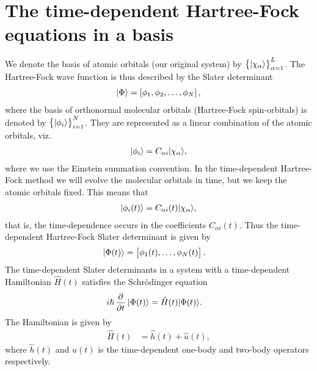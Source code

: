 \section{The time-dependent Hartree-Fock equations in a basis}
    We denote the basis of atomic orbitals (our original system) by
    $\left\{ | \chi_\alpha \rangle \right\}_{\alpha = 1}^L$. The Hartree-Fock wave function is
    thus described by the Slater determinant
    \begin{align}
        | \Phi \rangle = \left[ \phi_1, \phi_2, \dots, \phi_N \right],
    \end{align}
    where the basis of orthonormal molecular orbitals (Hartree-Fock
    spin-orbitals) is denoted by $\left\{ | \phi_i \rangle \right\}_{i = 1}^N$. They are
    represented as a linear combination of the atomic orbitals, viz.
    \begin{align}
        | \phi_i \rangle = C_{\alpha i}| \chi_{\alpha} \rangle,
    \end{align}
    where we use the Einstein summation convention. In the time-dependent
    Hartree-Fock method we will evolve the molecular orbitals in time, but we
    keep the atomic orbitals fixed. This means that
    \begin{align}
        | \phi_i(t) \rangle = C_{\alpha i}(t)| \chi_{\alpha} \rangle,
    \end{align}
    that is, the time-dependence occurs in the coefficients $C_{\alpha i}(t)$.
    Thus the time-dependent Hartree-Fock Slater determinant is given by
    \begin{align}
        | \Phi(t) \rangle
        &=
        \left[ 
            \phi_1(t), \dots, \phi_N(t)
         \right].
    \end{align}
    The time-dependent Slater determinants in a system with a time-dependent
    Hamiltonian $\hat{H}(t)$ satisfies the Schrödinger equation
    \begin{align}
        i\hslash\dpd[]{}{t}\ket{\Phi(t)}
        &= \hat{H}(t)\ket{\Phi(t)}.
    \end{align}
    The Hamiltonian is given by
    \begin{align}
        \hat{H}(t) &= \hat{h}(t) + \hat{u}(t),
    \end{align}
    where $\hat{h}(t)$ and $\hat{u}(t)$ is the time-dependent one-body and
    two-body operators respectively.

